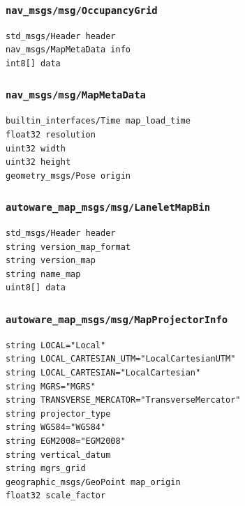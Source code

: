 \documentclass[
]{article}
\begin{document}
\subsubsection{\texorpdfstring{\texttt{nav\_msgs/msg/OccupancyGrid}}{nav\_msgs/msg/OccupancyGrid}}\label{nav_msgsmsgoccupancygrid}

\begin{verbatim}
std_msgs/Header header
nav_msgs/MapMetaData info
int8[] data
\end{verbatim}

\subsubsection{\texorpdfstring{\texttt{nav\_msgs/msg/MapMetaData}}{nav\_msgs/msg/MapMetaData}}\label{nav_msgsmsgmapmetadata}

\begin{verbatim}
builtin_interfaces/Time map_load_time
float32 resolution
uint32 width
uint32 height
geometry_msgs/Pose origin
\end{verbatim}

\subsubsection{\texorpdfstring{\texttt{autoware\_map\_msgs/msg/LaneletMapBin}}{autoware\_map\_msgs/msg/LaneletMapBin}}\label{autoware_map_msgsmsglaneletmapbin}

\begin{verbatim}
std_msgs/Header header
string version_map_format
string version_map
string name_map
uint8[] data
\end{verbatim}

\subsubsection{\texorpdfstring{\texttt{autoware\_map\_msgs/msg/MapProjectorInfo}}{autoware\_map\_msgs/msg/MapProjectorInfo}}\label{autoware_map_msgsmsgmapprojectorinfo}

\begin{verbatim}
string LOCAL="Local"
string LOCAL_CARTESIAN_UTM="LocalCartesianUTM"
string LOCAL_CARTESIAN="LocalCartesian"
string MGRS="MGRS"
string TRANSVERSE_MERCATOR="TransverseMercator"
string projector_type
string WGS84="WGS84"
string EGM2008="EGM2008"
string vertical_datum
string mgrs_grid
geographic_msgs/GeoPoint map_origin
float32 scale_factor
\end{verbatim}
\end{document}

